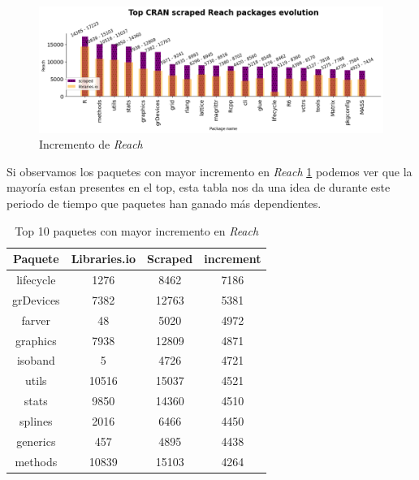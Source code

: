 \begin{figure}[ht!]
    \begin{center}
        \includegraphics[width=1\textwidth]{img/cran/reach_top2.png}
        \caption{Incremento de \textit{Reach}}
        \label{fig:Top reach Scraped}
    \end{center}
\end{figure}

Si observamos los paquetes con mayor incremento en \textit{Reach} \ref{tab:Top 10 paquetes con mayor incremento en Reach}
podemos ver que la mayoría estan presentes en el top, esta tabla nos da una idea de durante este periodo
de tiempo que paquetes han ganado más dependientes.

\begin{table}[ht!]
    \begin{center}
        \begin{tabular}{|c|c|c|c|}
            \hline
            \textbf{Paquete} & \textbf{Libraries.io} & \textbf{Scraped} & \textbf{increment} \\
            \hline
            lifecycle        & 1276                  & 8462             & 7186               \\
            grDevices        & 7382                  & 12763            & 5381               \\
            farver           & 48                    & 5020             & 4972               \\
            graphics         & 7938                  & 12809            & 4871               \\
            isoband          & 5                     & 4726             & 4721               \\
            utils            & 10516                 & 15037            & 4521               \\
            stats            & 9850                  & 14360            & 4510               \\
            splines          & 2016                  & 6466             & 4450               \\
            generics         & 457                   & 4895             & 4438               \\
            methods          & 10839                 & 15103            & 4264               \\
            \hline
        \end{tabular}
        \caption{Top 10 paquetes con mayor incremento en \textit{Reach}}
        \label{tab:Top 10 paquetes con mayor incremento en Reach}
    \end{center}
\end{table}

